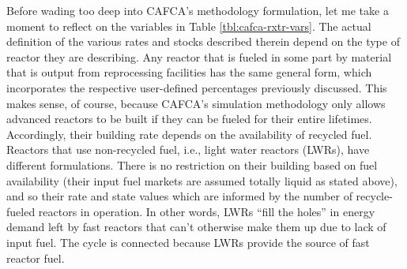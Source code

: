 Before wading too deep into CAFCA's methodology formulation, let me take a
moment to reflect on the variables in Table \ref{tbl:cafca-rxtr-vars}. The
actual definition of the various rates and stocks described therein depend on
the type of reactor they are describing. Any reactor that is fueled in some part
by material that is output from reprocessing facilities has the same general
form, which incorporates the respective user-defined percentages previously
discussed. This makes sense, of course, because CAFCA's simulation methodology
only allows advanced reactors to be built if they can be fueled for their entire
lifetimes. Accordingly, their building rate depends on the availability of
recycled fuel. Reactors that use non-recycled fuel, i.e., light water reactors
(LWRs), have different formulations. There is no restriction on their building
based on fuel availability (their input fuel markets are assumed totally liquid
as stated above), and so their rate and state values which are informed by the
number of recycle-fueled reactors in operation. In other words, LWRs ``fill the
holes'' in energy demand left by fast reactors that can't otherwise make them up
due to lack of input fuel. The cycle is connected because LWRs provide the
source of fast reactor fuel.


